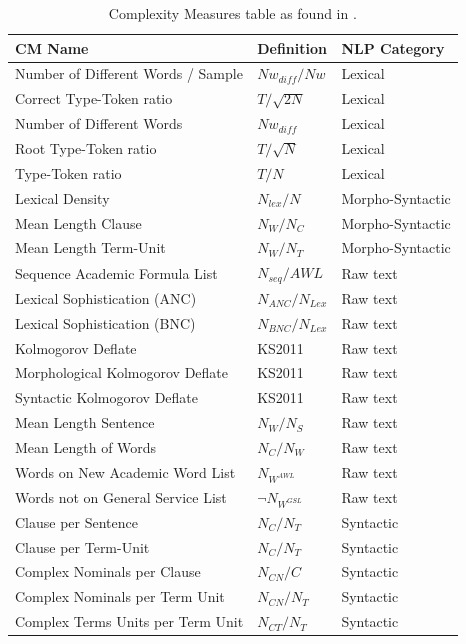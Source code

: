 \begin{table}[t]
	\center
	\caption {Complexity Measures table as found in \parencite{strobel2018text}.}\label{chap:relevant_work:tbl:complexity_measures}
	\begin{tabular}{lll}
		\hline
		CM Name & Definition & NLP Category \\
		\hline
		Number of Different Words / Sample & $Nw_{diff} / Nw$ & Lexical \\
		Correct Type-Token ratio & $T/\sqrt{2N}$ & Lexical \\
		Number of Different Words & $Nw_{diff}$ & Lexical \\
		Root Type-Token ratio & $T/\sqrt{N}$ & Lexical \\
		Type-Token ratio & $T/N$ & Lexical \\
		Lexical Density & $N_{lex}/N$ & Morpho-Syntactic \\
		Mean Length Clause & $N_{W}/N_{C}$ & Morpho-Syntactic \\
		Mean Length Term-Unit & $N_{W}/N_{T}$ & Morpho-Syntactic \\
		Sequence Academic Formula List & $N_{seq}/AWL$ & Raw text \\
		Lexical Sophistication (ANC) & $N_{ANC}/N_{Lex}$ & Raw text \\
		Lexical Sophistication (BNC) & $N_{BNC}/N_{Lex}$ & Raw text \\
		Kolmogorov Deflate & KS2011 & Raw text \\
		Morphological Kolmogorov Deflate & KS2011 & Raw text \\
		Syntactic Kolmogorov Deflate & KS2011 & Raw text \\
		Mean Length Sentence & $N_{W}/N_{S}$ & Raw text \\
		Mean Length of Words & $N_{C}/N_{W}$ & Raw text \\
		Words on New Academic Word List & ${N_{W^{AWL}}}$ & Raw text \\
		Words not on General Service List & $\neg{N_{W^{GSL}}}$ & Raw text \\
		Clause per Sentence & $N_{C}/N_{T}$ & Syntactic \\
		Clause per Term-Unit & $N_{C}/N_{T}$ & Syntactic \\
		Complex Nominals per Clause & $N_{CN}/C$ & Syntactic \\
		Complex Nominals per Term Unit & $N_{CN}/N_{T}$ & Syntactic \\
		Complex Terms Units per Term Unit & $N_{CT}/N_{T}$ & Syntactic \\

\end{tabular}
\end{table}
